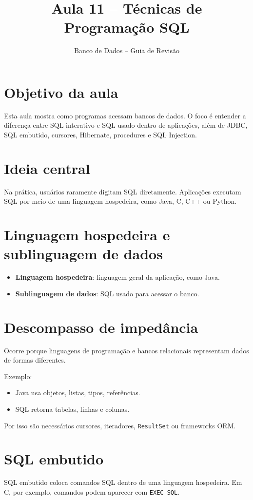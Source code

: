 \documentclass[12pt,a4paper]{article}
\title{Aula 11 -- Técnicas de Programação SQL}
\author{Banco de Dados -- Guia de Revisão}
\date{}
\begin{document}
\maketitle
\tableofcontents
\newpage

\section{Objetivo da aula}
Esta aula mostra como programas acessam bancos de dados. O foco é entender a diferença entre SQL interativo e SQL usado dentro de aplicações, além de JDBC, SQL embutido, cursores, Hibernate, procedures e SQL Injection.

\section{Ideia central}
Na prática, usuários raramente digitam SQL diretamente. Aplicações executam SQL por meio de uma linguagem hospedeira, como Java, C, C++ ou Python.

\section{Linguagem hospedeira e sublinguagem de dados}
\begin{itemize}
    \item \textbf{Linguagem hospedeira}: linguagem geral da aplicação, como Java.
    \item \textbf{Sublinguagem de dados}: SQL usado para acessar o banco.
\end{itemize}

\section{Descompasso de impedância}
Ocorre porque linguagens de programação e bancos relacionais representam dados de formas diferentes.

Exemplo:
\begin{itemize}
    \item Java usa objetos, listas, tipos, referências.
    \item SQL retorna tabelas, linhas e colunas.
\end{itemize}

Por isso são necessários cursores, iteradores, \texttt{ResultSet} ou frameworks ORM.

\section{SQL embutido}
SQL embutido coloca comandos SQL dentro de uma linguagem hospedeira. Em C, por exemplo, comandos podem aparecer com \texttt{EXEC SQL}.
\end{document}
